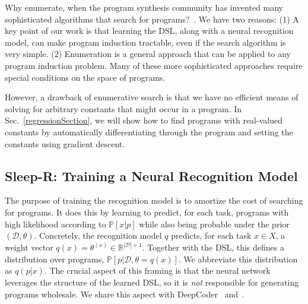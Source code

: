 \documentclass{article}
\newcommand{\probability}{\mathds{P}} %
\begin{document}
Why enumerate, when the program synthesis community has invented many
sophisticated algorithms that search for programs?~\cite{solar2008program,schkufza2013stochastic,feser2015synthesizing,osera2015type,polozov2015flashmeta}.
We have two reasons:
(1) A key point of our work is that learning the DSL, along with a neural recognition model, can make program induction tractable, even if the search algorithm is very simple.
(2) Enumeration is a general approach that can be applied to any program induction problem. Many of these more sophisticated approaches require special conditions on
  the space of  programs.

  However, a drawback of   enumerative search  is that we have no
efficient means of solving for arbitrary constants that might occur in a
program. In Sec.~\ref{regressionSection},
we will show how to find programs with real-valued constants
by automatically differentiating through the program and setting the constants using gradient descent.







\subsection{Sleep-R: Training a Neural Recognition Model}\label{recognitionSection}

The purpose of training the recognition model is to amortize the cost
of searching for programs.  It does this by learning to predict, for
each task, programs with high likelihood according to
$\probability[x|p]$ while also being probable under the prior
$(\mathcal{D},\theta)$.  Concretely, the recognition model $q$
predicts, for each task $x\in X$, a weight vector $q(x) =
\theta^{(x)}\in \mathbb{R}^{|\mathcal{D}| + 1}$.  Together with the
DSL, this defines a distribution over programs,
$\probability[p|\mathcal{D},\theta = q(x)]$.  We abbreviate this
distribution as $q(p|x)$.  The crucial aspect of this framing is that
the neural network leverages the structure of the learned DSL, so it
is \emph{not} responsible for generating programs wholesale.  We share
this aspect with DeepCoder~\cite{balog2016deepcoder}
and~\cite{menon2013machine}.
\end{document}
